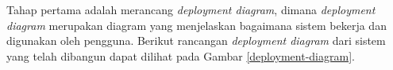 
Tahap pertama adalah merancang \textit{deployment diagram}, dimana \textit{deployment diagram} merupakan diagram yang menjelaskan bagaimana sistem bekerja dan digunakan oleh pengguna. Berikut rancangan \textit{deployment diagram} dari sistem yang telah dibangun dapat dilihat pada Gambar \ref{deployment-diagram}.

